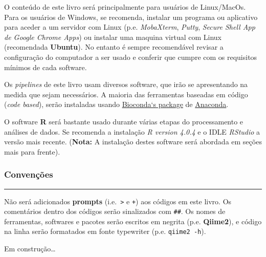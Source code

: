 \documentclass[
]{book}
\begin{document}
O conteúdo de este livro será principalmente para usuários de Linux/MacOs. Para os usuários de Windows, se recomenda, instalar um programa ou aplicativo para aceder a um servidor com Linux (p.e. \emph{MobaXterm}, \emph{Putty}, \emph{Secure Shell App de Google Chrome Apps}) ou instalar uma maquina virtual com Linux (recomendada \textbf{Ubuntu}). No entanto é sempre recomendável revisar a configuração do computador a ser usado e conferir que cumpre com os requisitos mínimos de cada software.

Os \emph{pipelines} de este livro usam diversos software, que irão se apresentando na medida que sejam necessários. A maioria das ferramentas baseadas em código (\emph{code based}), serão instaladas usando \href{https://anaconda.org/bioconda}{Bioconda`s package} de \href{https://anaconda.org/}{Anaconda}.

O software \textbf{R} será bastante usado durante várias etapas do processamento e análises de dados. Se recomenda a instalação \emph{R version 4.0.4} e o IDLE \emph{RStudio} a versão mais recente. (\textbf{Nota:} A instalação destes software será abordada em seções mais para frente).

\hypertarget{convenuxe7uxf5es}{%
\subsubsection*{Convenções}\label{convenuxe7uxf5es}}

\begin{center}\rule{0.5\linewidth}{0.5pt}\end{center}

Não será adicionados \textbf{prompts} (i.e.~\texttt{\textgreater{}} e \texttt{+}) aos códigos em este livro. Os comentários dentro dos códigos serão sinalizados com \texttt{\#\#}. Os nomes de ferramentas, softwares e pacotes serão escritos em negrita (p.e. \textbf{Qiime2}), e código na linha serão formatados em fonte typewriter (p.e. \texttt{qiime2\ -h}).

Em construção\ldots{}

  
\end{document}
